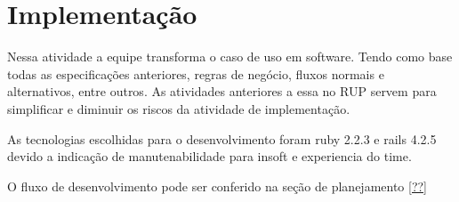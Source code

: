 \section{Implementação}

Nessa atividade a equipe transforma o caso de uso em software. Tendo como base todas as especificações anteriores, regras de negócio, fluxos normais e alternativos, entre outros. As atividades anteriores a essa no RUP servem para simplificar e diminuir os riscos da atividade de implementação.

As tecnologias escolhidas para o desenvolvimento foram ruby 2.2.3 e rails 4.2.5 devido a indicação de manutenabilidade para insoft e experiencia do time.

O fluxo de desenvolvimento pode ser conferido na seção de planejamento \ref{??}
